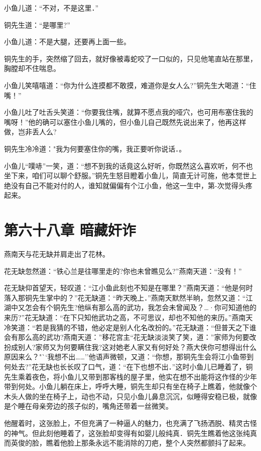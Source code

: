 \documentclass[12pt,oneside]{book}
\begin{document}
小鱼儿道：``不对，不是这里．''

铜先生道：``是哪里?''

小鱼儿道：不是大腿，还要再上面一些。

铜先生的手，突然缩了回去，就好像被毒蛇咬了一口似的，只见他笔直站在那里，胸膛却不住喘息。

小鱼儿笑嘻嘻道：``你为什么连摸都不敢摸，难道你是女人么?''铜先生大喝道：``住嘴！''

小鱼儿吐了吐舌头笑道：``你要我住嘴，就算不愿点我的哑穴，也可用布塞住我的嘴呀！''他的确可以塞住小鱼儿嘴的，但小鱼儿自己既然先说出来了，他再这样做，岂非丢人么?

铜先生冷冷道："我为何要塞住你的嘴，我正要听你说话．。

小鱼儿``噗哧''一笑，道：``想不到我的话竟这么好听，你既然这么喜欢听，何不也坐下来，咱们可以聊个舒服。''铜先生怒目瞪着小鱼儿，简直无计可施，他本觉世上绝没有自己不能对付的人，谁知就偏偏有个江小鱼，他这一生中，第-次觉得头疼起来。

\hypertarget{ux7b2cux516dux5341ux516bux7ae0-ux6697ux85cfux5978ux8bc8}{%
\chapter{第六十八章
暗藏奸诈}\label{ux7b2cux516dux5341ux516bux7ae0-ux6697ux85cfux5978ux8bc8}}

燕南天与花无缺并肩走出了花林。

花无缺忽然道：``铁心兰是往哪里走的?你也未曾瞧见么?''燕南天道：``没有！''

花无缺仰首望天，轻叹道：``江小鱼此刻也不知是在哪里？''燕南天道：``他是何时落入那铜先生掌中的？''花无缺道：``昨天晚上．''燕南天默然半晌，忽然又道：``江湖中又怎会有个铜先生?他纵有那么高的武功，我怎会未曾闻及？\ldots·你可知道他的来历?''花无缺道：``在下只知他武功之高，不可思议，却也不知他的来历。''燕南天冷笑道：``若是我猜的不错，他必定是别人化名改扮的。''花无缺道：``但普天之下谁会有那么高的武功?燕南天道：''移花宫主``花无缺淡淡笑了笑，道：''家师为何要改扮成别人?家师又为何要瞒住我?这对她老人家又有何好处？燕大侠你可想得出什么原因来么？"``我想不出\ldots\ldots{}''他语声微顿，又道：``你想，那铜先生会将江小鱼带到何处去?''花无缺也长长叹了口气，道：``在下也想不出．''这时小鱼儿已睡着了，铜先生乘着夜色，将小鱼儿又带到那客栈的屋子里，他实在想不出能将这作怪的少年带到何处。小鱼儿躺在床上，呼呼大睡，铜先生却只有坐在椅子上瞧着，他就像个木头人做的坐在椅子上，动也不动，只见小鱼儿鼻息沉沉，似睡得安稳已极，就像是个睡在母亲旁边的孩子似的，嘴角还带着一丝微笑。

他醒着时，这张脸上，不但充满了一种逼人的魅力，也充满了飞扬洒脱、精灵古怪的神气。但此刻他睡着了，这张脸却变得有如婴儿般纯真．铜先生瞧着他这张纯真而英俊的脸，瞧着他脸上那条永远不能消除的刀疤，整个人突然都颤抖了起来。
\end{document}
